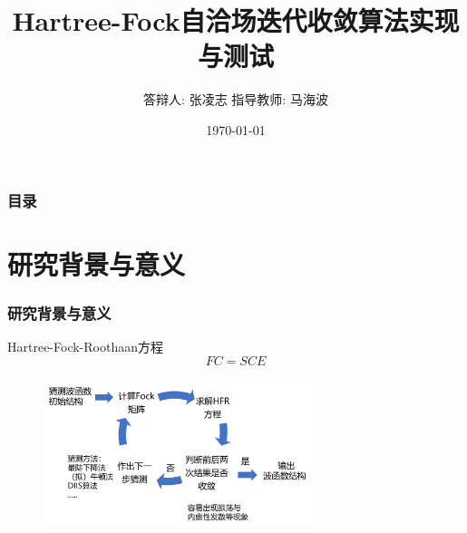 \documentclass[10pt,aspectratio=43,mathserif,UTF8]{beamer}
\title{Hartree-Fock自洽场迭代收敛算法实现与测试
} %
\author{答辩人: 张凌志 \newline \newline 指导教师: 马海波} %
\institute %
{
南京大学化学化工学院 \\ %
\medskip
}
\date{\today} %
\begin{document}
\begin{frame}
\titlepage %
\end{frame}

\begin{frame}
\frametitle{目录} %
\tableofcontents %
\end{frame}


\section{研究背景与意义} %



\begin{frame}
\frametitle{研究背景与意义}
Hartree-Fock-Roothaan方程
\begin{equation}
	FC=SCE
\end{equation}

\begin{figure}[htbp]
	\centering
	\includegraphics[width=0.7\textwidth]{figure/HF/HF_process2.png}
\end{figure}
\end{frame}
\end{document}

